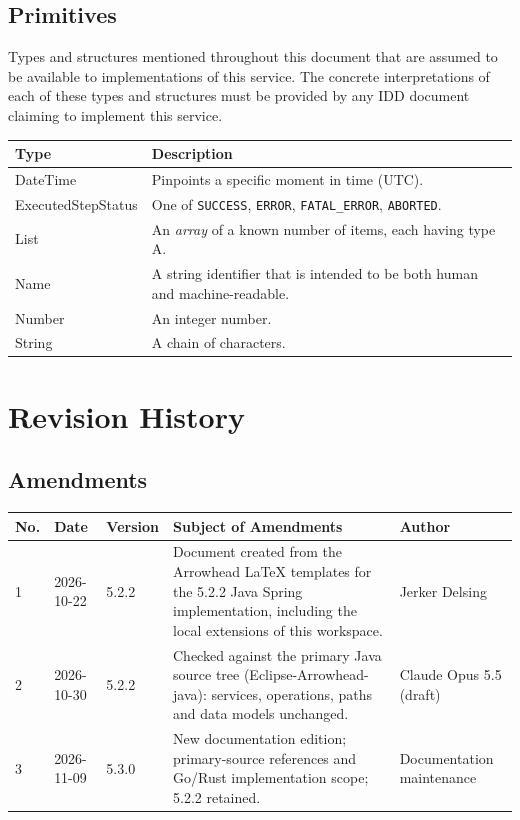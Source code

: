 \documentclass[a4paper]{arrowhead}
\newcommand{\pdef}[1]{{\textcolor{ArrowheadGrey}{#1\label{sec:model:primitives:#1}\label{sec:model:primitives:#1s}\label{sec:model:primitives:#1es}}}}
\begin{document}
\subsection{Primitives}
\label{sec:model:primitives}

Types and structures mentioned throughout this document that are assumed to be available to implementations of this service.
The concrete interpretations of each of these types and structures must be provided by any IDD document claiming to implement this service.

\noindent\begin{tabularx}{\textwidth}{| p{4.6cm} | X |} \hline
\rowcolor{gray!33} Type & Description \\ \hline
\pdef{DateTime} & Pinpoints a specific moment in time (UTC). \\ \hline
\pdef{ExecutedStepStatus} & One of \texttt{SUCCESS}, \texttt{ERROR}, \texttt{FATAL\_\allowbreak{}ERROR}, \texttt{ABORTED}. \\ \hline
\pdef{List} & An \textit{array} of a known number of items, each having type A. \\ \hline
\pdef{Name} & A string identifier that is intended to be both human and machine-readable. \\ \hline
\pdef{Number} & An integer number. \\ \hline
\pdef{String} & A chain of characters. \\ \hline
\end{tabularx}

\newpage




\newpage

\section{Revision History}
\subsection{Amendments}

\noindent\begin{tabularx}{\textwidth}{| p{1cm} | p{3cm} | p{2cm} | X | p{4cm} |} \hline
\rowcolor{gray!33} No. & Date & Version & Subject of Amendments & Author \\ \hline

1 & 2026-10-22 & 5.2.2 & Document created from the Arrowhead LaTeX templates for the 5.2.2 Java Spring implementation, including the local extensions of this workspace. & Jerker Delsing \\ \hline
2 & 2026-10-30 & 5.2.2 & Checked against the primary Java source tree (Eclipse-Arrowhead-java): services, operations, paths and data models unchanged. & Claude Opus 5.5 (draft) \\ \hline
3 & 2026-11-09 & 5.3.0 & New documentation edition; primary-source references and Go/Rust implementation scope; 5.2.2 retained. & Documentation maintenance \\ \hline
\end{tabularx}
\end{document}
